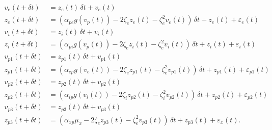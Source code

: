 \documentclass[]{article}
\begin{document}
\begin{align}
	v_e(t+\delta t) &= z_e(t)\,\delta t + v_e(t)\\
	z_e(t+\delta t) &= (\alpha_{pe}g\left(v_p(t)\right) - 2\zeta_{e}z_e(t) - \zeta_{e}^2v_e(t))\,\delta t + z_e(t) + \varepsilon_e(t) \\
	v_i(t+\delta t) &= z_i(t)\,\delta t + v_i(t)\\
	z_i(t+\delta t) &= \left(\alpha_{pi}g\left(v_p(t)\right) - 2\zeta_{e}z_i(t) - \zeta_{e}^2v_i(t)\right)\,\delta t + z_i(t) + \varepsilon_i(t)\\
	v_{p1}(t+\delta t) &= z_{p1}(t)\,\delta t + v_{p1}(t) \\
	z_{p1}(t+\delta t) &= (\alpha_{ep}g\left(v_e(t)\right) - 2\zeta_{e}z_{p1}(t) - \zeta_{e}^2v_{p1}(t))\,\delta t + z_{p1}(t) + \varepsilon_{p1}(t)\\
	v_{p2}(t+\delta t) &= z_{p2}(t)\,\delta t + v_{p2}(t) \\
	z_{p2}(t+\delta t) &= (\alpha_{ip}g\left(v_i(t)\right) - 2\zeta_{i}z_{p2}(t) - \zeta_{i}^2v_{p2}(t))\,\delta t + z_{p2}(t) + \varepsilon_{p2}(t) \\
	v_{p3}(t+\delta t) &= z_{p3}(t)\,\delta t + v_{p3}(t) \\
	z_{p3}(t+\delta t) &= (\alpha_{xp}\mu_x - 2\zeta_{e}z_{p3}(t) - \zeta_{e}^2v_{p3}(t))\,\delta t + z_{p3}(t) + \varepsilon_x(t).
\end{align}



\end{document}
